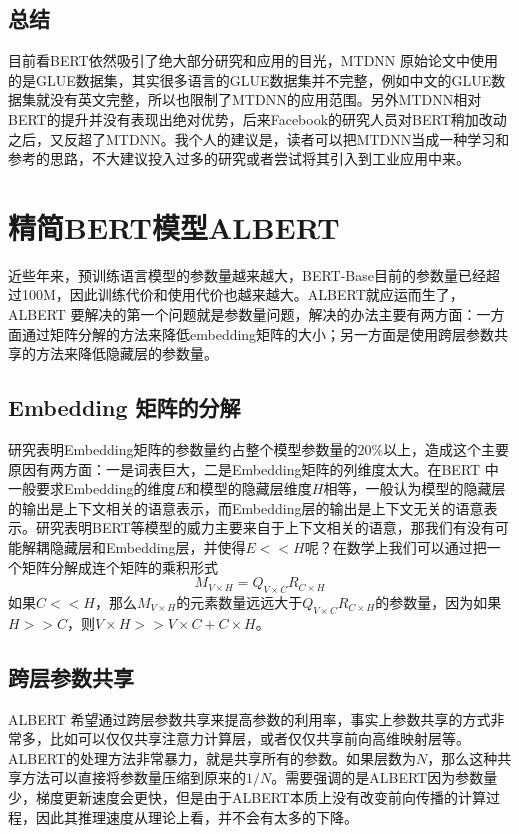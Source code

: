 \documentclass[twoside,a4paper,12pt]{book}%
\begin{document}
\subsection{总结}
目前看\gls{BERT}依然吸引了绝大部分研究和应用的目光，\gls{MTDNN} 原始论文中使用的是GLUE数据集，其实很多语言的GLUE数据集并不完整，例如中文的GLUE数据集就没有英文完整，所以也限制了\gls{MTDNN}的应用范围。另外\gls{MTDNN}相对\gls{BERT}的提升并没有表现出绝对优势，后来Facebook的研究人员对\gls{BERT}稍加改动之后，又反超了\gls{MTDNN}。我个人的建议是，读者可以把\gls{MTDNN}当成一种学习和参考的思路，不大建议投入过多的研究或者尝试将其引入到工业应用中来。

\section{精简BERT模型ALBERT}
近些年来，预训练语言模型的参数量越来越大，BERT-Base目前的参数量已经超过100M，因此训练代价和使用代价也越来越大。ALBERT就应运而生了，ALBERT 要解决的第一个问题就是参数量问题，解决的办法主要有两方面：一方面通过矩阵分解的方法来降低embedding矩阵的大小；另一方面是使用跨层参数共享的方法来降低隐藏层的参数量。
\subsection{Embedding 矩阵的分解}
研究表明Embedding矩阵的参数量约占整个模型参数量的$20\%$以上，造成这个主要原因有两方面：一是词表巨大，二是Embedding矩阵的列维度太大。在\gls{BERT} 中一般要求Embedding的维度$E$和模型的隐藏层维度$H$相等，一般认为模型的隐藏层的输出是上下文相关的语意表示，而Embedding层的输出是上下文无关的语意表示。研究表明\gls{BERT}等模型的威力主要来自于上下文相关的语意，那我们有没有可能解耦隐藏层和Embedding层，并使得$E<<H$呢？在数学上我们可以通过把一个矩阵分解成连个矩阵的乘积形式
$$
M_{V \times H}=Q_{V \times C}R_{C \times H}
$$
如果$C<<H$，那么$M_{V \times H}$的元素数量远远大于$Q_{V \times C}R_{C \times H}$的参数量，因为如果$H>>C$，则$V\times H >> V \times C + C \times H$。

\subsection{跨层参数共享}
ALBERT 希望通过跨层参数共享来提高参数的利用率，事实上参数共享的方式非常多，比如可以仅仅共享注意力计算层，或者仅仅共享前向高维映射层等。ALBERT的处理方法非常暴力，就是共享所有的参数。如果层数为$N$，那么这种共享方法可以直接将参数量压缩到原来的$1/N$。需要强调的是ALBERT因为参数量少，梯度更新速度会更快，但是由于ALBERT本质上没有改变前向传播的计算过程，因此其推理速度从理论上看，并不会有太多的下降。
\end{document}

